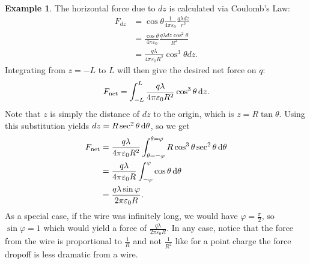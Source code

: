 \documentclass[a4paper]{scrartcl}
\theoremstyle{definition}
\newtheorem{example}{Example}
\let\epsilon\varepsilon
\begin{document}
\begin{example}
  The horizontal force due to $dz$ is calculated via Coulomb's Law:
  \begin{align*}
    F_{dz} &= \cos \theta \frac{1}{4\pi \epsilon_0} \frac{q\lambda dz}{r^2} \\
           &= \frac{\cos \theta}{4\pi\epsilon_0} \frac{q\lambda dz \cos^2 \theta}{R^2} \\
           &= \frac{q\lambda}{4\pi \epsilon_0 R^2}\cos^3 \theta dz.
  \end{align*}
  Integrating from $z = -L$ to $L$ will then give the desired net force on $q$:
  \[
    F_{\text{net}} = \int_{-L}^{L} \frac{q\lambda}{4\pi \epsilon_0 R^2} \cos^3 \theta \dl z.
  \]
  Note that $z$ is simply the distance of $dz$ to the origin, which is $z = R\tan \theta$. Using this substitution yields $dz = R\sec^2 \theta \dl \theta$, so we get
  \begin{align*}
    F_{\text{net}} &= \frac{q\lambda}{4\pi \epsilon_0 R^2} \int_{\theta = -\varphi}^{\theta = \varphi} R \cos^3 \theta \sec^2 \theta \dl \theta \\
                   &= \frac{q\lambda}{4\pi \epsilon_0 R} \int_{-\varphi}^{\varphi} \cos \theta \dl \theta \\
                   &= \frac{q\lambda \sin\varphi}{2\pi \epsilon_0 R}.
  \end{align*}
  As a special case, if the wire was infinitely long, we would have $\varphi = \frac{\pi}{2}$, so $\sin \varphi = 1$ which would yield a force of $\frac{q\lambda}{2\pi \epsilon_0 R}$. In any case, notice that the force from the wire is proportional to $\frac{1}{R}$ and not $\frac{1}{R^2}$ like for a point charge \Emdash the force dropoff is less dramatic from a wire.
\end{example}
\end{document}
